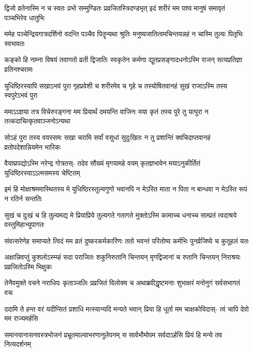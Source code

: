 \fourlineindentedshloka
{द्विजो व्रतेनास्मि न च स्वतः प्रभो}
{सम्मुण्डितः प्रव्रजितस्त्रिदण्डभृत्}
{इदं शरीरं मम पश्य मानुषं}
{समावृतं पञ्चभिरेव धातुभिः}


\fourlineindentedshloka
{ममेह पञ्चेन्द्रियगात्रदर्शिनो}
{वदन्ति पञ्चैव पितॄन्यथा श्रुतिः}
{मनुष्यजातित्वमचिन्तयन्नहं}
{न चास्मि तुल्यः पितृभिः स्वभावतः}


\fourlineindentedshloka
{कङ्को हि नाम्ना विषयं तवागतो}
{व्रती द्विजातिः स्वकृतेन कर्मणा}
{द्यूतप्रसङ्गादधनोऽस्मि राजन्}
{सत्यप्रतिज्ञा व्रतिनश्चरामः}


\fourlineindentedshloka
{युधिष्ठिरस्यापि सखाऽभवं पुरा}
{गृहप्रवेशी च शरीरमेव च}
{गृहे च तस्योषितवानहं सुखं}
{राजाऽस्मि तस्य स्वपुरेऽभवं पुरा}


\fourlineindentedshloka
{ममाऽऽज्ञया तत्र विचेरुरङ्गना}
{मम प्रियार्थं दमयन्ति वाजिनः}
{मया कृतं तस्य पुरे तु यत्पुरा}
{न तत्कदाचित्कृतवाञ्जनोऽन्यथा}


\fourlineindentedshloka
{सोऽहं पुरा तस्य वयस्समः सखा}
{चरामि सर्वां वसुधां सुदुःखितः}
{न तु प्रशान्तिं क्वचिदाप्तवानहं}
{व्रतोपदेशान्नियमेन भारिकः}


\fourlineindentedshloka
{वैयाघ्रपद्योऽस्मि नरेन्द्र गोत्रतस्-}
{तदेव सौख्यं मृगयामहे वयम्}
{कृतज्ञभावेन मयाऽनुकीर्तितं}
{युधिष्ठिरस्याऽऽत्मसमस्य चेष्टितम्}


\fourlineindentedshloka
{इमं हि मोक्षाश्रममास्थितस्य मे}
{युधिष्ठिरस्तुल्यगुणो भवानपि}
{न मेऽस्ति माता न पिता न बान्धवा}
{न मेऽस्ति रूपं न रतिर्न सन्ततिः}


\fourlineindentedshloka
{सुखं च दुःखं च हि तुल्यमद्य मे}
{प्रियाप्रिये तुल्यगते गतागते}
{मुक्तोऽस्मि कामाच्च धनाच्च साम्प्रतं}
{त्वदाश्रये वस्तुमिहाभ्युपागतः}


\fourlineindentedshloka
{संवत्सरेणेह समाप्यते त्विदं}
{मम व्रतं दुष्करकर्मकारिणः}
{ततो भवन्तं परितोष्य कर्मभिः}
{पुनर्व्रजिष्ये च कुतूहलं यतः}


\fourlineindentedshloka
{अक्षान्निवप्तुं कुशलोऽस्म्य्हं सदा}
{पराजितः शकुनिरुतानि चिन्तयन्}
{मृगद्विजानां च रुतानि चिन्तयन्}
{निराश्रयः प्रव्रजितोऽस्मि भिक्षुकः}



\fourlineindentedshloka
{तेनैवमुक्ते वचने नराधिपः}
{कृताञ्जलिः प्रव्रजितं विलोक्य च}
{अथाब्रवीद्धृष्टमनाः शुभाक्षरं}
{मनोनुगं सर्वसभागतं वचः}


\fourlineindentedshloka
{ददामि ते हन्त वरं यदीप्सितं}
{प्रशाधि मत्स्यान्यदि मन्यते भवान्}
{प्रिया हि धूर्ता मम चाक्षकोविदास्-}
{त्वं चापि देवो मम राज्यमर्हसि}


\fourlineindentedshloka
{समानयानासनवस्त्रभोजनं}
{प्रभ्रूतमाल्याभरणानुलेपनम्}
{स सार्वभौमोपम सर्वदाऽर्हसि}
{प्रियं हि मन्ये तव नित्यदर्शनम्}


